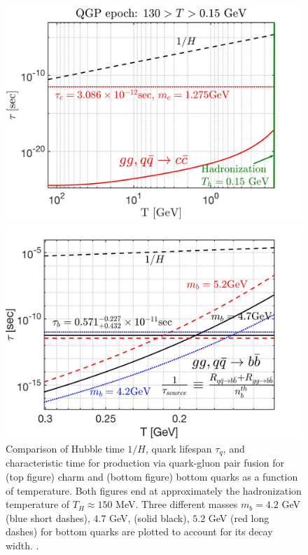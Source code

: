 \begin{figure}  
\centerline{\includegraphics[width=0.9\linewidth]{./plots/CharmQuark_QGP.jpg}}
\centerline{\includegraphics[width=0.9\linewidth]{./plots/BQuarkReactionTime_bottom.jpg}}
\caption{Comparison of Hubble time $1/H$, quark lifespan $\tau_{q}$, and characteristic time for production via quark-gluon pair fusion for (top figure) charm and (bottom figure) bottom quarks as a function of temperature. Both figures end at approximately the hadronization temperature of $T_{H}\approx150$ MeV. Three different masses $m_{b}=4.2$ GeV (blue short dashes), $4.7$ GeV, (solid black), $5.2$ GeV (red long dashes) for bottom quarks are plotted to account for its decay width. . }
\label{BCreaction_fig}
\end{figure}



